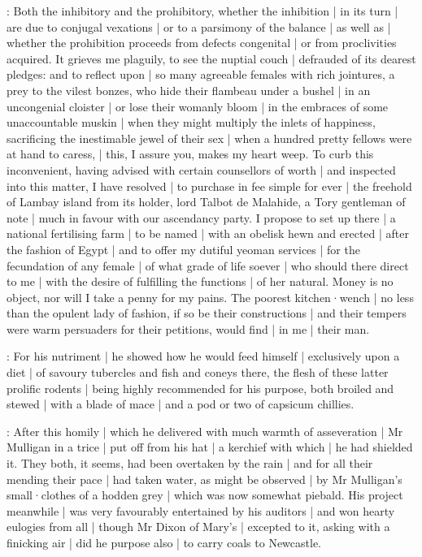 \mulligan:
Both the inhibitory and the prohibitory,
whether the inhibition |
in its turn |
are due to conjugal vexations |
or to a parsimony of the balance |
as well as |
whether the prohibition proceeds from defects congenital |
or from proclivities acquired.
It grieves me plaguily,
to see the nuptial couch |
defrauded of its dearest pledges:
and to reflect upon |
so many agreeable females with rich jointures,
a prey to the vilest bonzes,
who hide their flambeau under a bushel |
in an uncongenial cloister |
or lose their womanly bloom |
in the embraces of some unaccountable muskin |
when they might multiply the inlets of happiness,
sacrificing the inestimable jewel of their sex |
when a hundred pretty fellows were at hand to caress, |
this,
I assure you,
makes my heart weep.
To curb this inconvenient,
having advised with certain counsellors of worth |
and inspected into this matter,
I have resolved |
to purchase in fee simple for ever |
the freehold of Lambay island from its holder,
lord Talbot de Malahide,
a Tory gentleman of note |
much in favour with our ascendancy party.
I propose to set up there |
a national fertilising farm |
to be named  |
with an obelisk hewn and erected |
after the fashion of Egypt |
and to offer my dutiful yeoman services |
for the fecundation of any female |
of what grade of life soever |
who should there direct to me |
with the desire of fulfilling the functions |
of her natural.
Money is no object,
nor will I take a penny for my pains.
The poorest kitchen·wench |
no less than the opulent lady of fashion,
if so be their constructions |
and their tempers were warm persuaders for their petitions,
would find |
in me |
their man.

:
For his nutriment |
he showed how he would feed himself |
exclusively upon a diet |
of savoury tubercles and fish and coneys there,
the flesh of these latter prolific rodents |
being highly recommended for his purpose,
both broiled and stewed |
with a blade of mace |
and a pod or two of capsicum chillies.

:
After this homily |
which he delivered with much warmth of asseveration |
Mr Mulligan in a trice |
put off from his hat |
a kerchief with which |
he had shielded it.
They both,
it seems,
had been overtaken by the rain |
and for all their mending their pace |
had taken water,
as might be observed |
by Mr Mulligan's small·clothes of a hodden grey |
which was now somewhat piebald.
His project meanwhile |
was very favourably entertained by his auditors |
and won hearty eulogies from all |
though Mr Dixon of Mary's |
excepted to it,
asking with a finicking air |
did he purpose also |
to carry coals to Newcastle.

